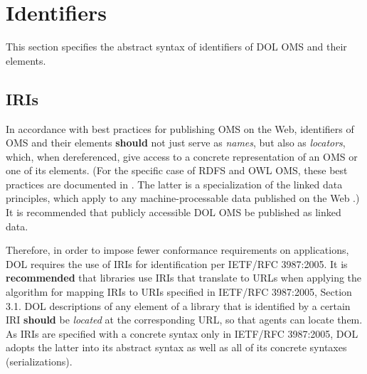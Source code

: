 \documentclass[10pt,fleqn,%
\ifpretendfinal
final%
\else
draft%
\fi,
]{scrreprt}
\makeatletter
\newcommand*\CommentAuthor{}
\renewcommand*\CommentAuthor{#1}}
\newcommand*\CommentDate{}
\renewcommand*\CommentDate{#1}}
\newcommand*\CommentId{}
\renewcommand*\CommentId{#1}}
\newcommand*\CommentType{}
\renewcommand*\CommentType{#1}}
\newcommand*{\SetCommentColorByType}[1]{%
\edef\localType{{#1}}%
\expandafter\ifstrequal\localType{q-aut}{\colorlet{CommentColor}{red}}{%
\expandafter\ifstrequal\localType{q-all}{\colorlet{CommentColor}{orange}}{%
\expandafter\ifstrequal\localType{todo}{\colorlet{CommentColor}{orange}}{%
\expandafter\ifstrequal\localType{fyi}{\colorlet{CommentColor}{lightgray}}{%
\colorlet{CommentColor}{yellow}}}}}}
\newcommand*{\SetCommentPrefixByType}[1]{%
\edef\localType{{#1}}%
\expandafter\@ifmtarg\localType{%
\edef\CommentPrefix{}%
}{%
\caseupper[q]{#1}%
\edef\CommentPrefix{\thestring: }%
}}
\newcommand*{\initComment}[1]{%
\setkeys{Comment}{#1}%
\SetCommentColorByType{\CommentType}%
\relax%
\SetCommentPrefixByType{\CommentType}%
\relax%
}
\newcommand*{\todonote}[2][]{%
\initComment{#1}%
\pdfcomment[author=\CommentAuthor,color=CommentColor,date=\CommentDate,id=\CommentId]{%
\CommentPrefix
#2}}
\renewcommand*{\todonote}[2][]{%
\initComment{#1}%
\ednote{\CommentPrefix #2}}
\newcommand*{\CLnote}[2][author=Christoph Lange]{%
\todonote[author=Christoph Lange,#1]{#2} 
}
\newcommand*{\recommended}{\textbf{recommended}\xspace}
\newcommand*{\should}{\textbf{should}\xspace}
\newcommand*{\IS}{OMG Specification\xspace}
\newcommand{\sclause}[1]{\section{#1}}
\newcommand{\ssclause}[1]{\subsection{#1}}
\newcommand{\nisref}[1]{#1}
\makeatother
\begin{document}


\sclause{Identifiers}\label{c:identifiers}

This section specifies the abstract syntax of identifiers of DOL OMS and their elements.

\ssclause{IRIs}\label{c:iris}

In accordance with best practices for publishing OMS on the Web, identifiers of OMS and their 
elements \should not just serve as \emph{names}, but also as \emph{locators}, which, when 
dereferenced, give access to a concrete representation of an OMS or one of its elements.  (For the 
specific case of RDFS and OWL OMS, these best practices are documented in 
\cite{W3C:NOTE-swbp-vocab-pub-20080828}.  The latter is a specialization of the linked data 
principles, which apply to any machine-processable data published on the Web 
\cite{BernersLee:LinkedData2006}.)  It is recommended that publicly accessible DOL OMS be published 
as linked data.

Therefore, in order to impose fewer conformance requirements on applications, DOL requires the use of
 IRIs for identification per \nisref{IETF/RFC 3987:2005}.
  It is \recommended that libraries use 
IRIs that translate to URLs when applying the algorithm for mapping IRIs to URIs specified in 
\nisref{IETF/RFC 3987:2005, Section 3.1}.  DOL descriptions of any element of a library that is 
identified by a certain IRI \should be \emph{located} at the corresponding URL, so that agents can 
locate them.  As IRIs are specified with a concrete syntax only in \nisref{IETF/RFC 3987:2005}, DOL 
adopts the latter into its abstract syntax as well as all of its concrete syntaxes 
(serializations).

\end{document}
